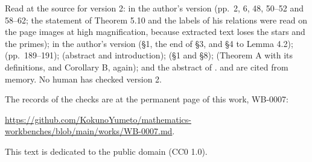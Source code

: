 \documentclass[11pt,a4paper]{article}
\theoremstyle{plain}
\theoremstyle{definition}
\theoremstyle{remark}
\newcommand{\recordurl}{https://github.com/KokunoYumeto/mathematics-workbenches/blob/main/works/WB-0007.md}
\begin{document}
Read at the source for version 2: \cite{Lo} in the author's version (pp.~2, 6, 48, 50--52 and 58--62; the statement
of Theorem 5.10 and the labels of his relations were read on the page images at high magnification, because
extracted text loses the stars and the primes); \cite{NS} in the author's version (\S1, the end of \S3, and \S4 to
Lemma 4.2); \cite{Fu} (pp.~189--191); \cite{DG} (abstract and introduction); \cite{LNS} (\S1 and \S8); \cite{BZ}
(Theorem A with its definitions, and Corollary B, again); and the abstract of \cite{Bo}. \cite{Bi} and \cite{Ku} are
cited from memory. No human has checked version 2.

The records of the checks are at the permanent page of this work, WB-0007:

{\raggedright\smallskip\noindent\url{\recordurl}.\par}

\smallskip
This text is dedicated to the public domain (CC0 1.0).
\end{document}
